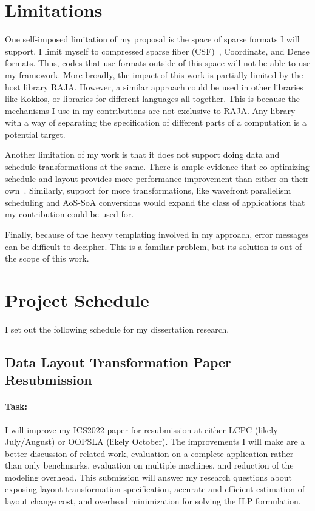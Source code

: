\documentclass{article}
\begin{document}
\section{Limitations}
\label{Sec:Limitations}
One self-imposed limitation of my proposal is the space of sparse formats I will support.
I limit myself to compressed sparse fiber (CSF)~\cite{smith2015tensor}, Coordinate, and Dense formats.
Thus, codes that use formats outside of this space will not be able to use my framework.
More broadly, the impact of this work is partially limited by the host library RAJA. 
However, a similar approach could be used in other libraries like Kokkos, or libraries for different languages all together.
This is because the mechanisms I use in my contributions are not exclusive to RAJA. 
Any library with a way of separating the specification of different parts of a computation is a potential target.

Another limitation of my work is that it does not support doing data and schedule transformations at the same. 
There is ample evidence that co-optimizing schedule and layout provides more performance improvement than either on their own~\cite{shirako2019integrating}.
Similarly, support for more transformations, like wavefront parallelism scheduling and AoS-SoA conversions would expand the class of applications that my contribution could be used for.

Finally, because of the heavy templating involved in my approach, error messages can be difficult to decipher. 
This is a familiar problem, but its solution is out of the scope of this work.


\section{Project Schedule}
\label{Sec:Schedule}
I set out the following schedule for my dissertation research.

\subsection{Data Layout Transformation Paper Resubmission}

\paragraph{Task:} I will improve my ICS2022 paper for resubmission at either LCPC (likely July/August) or OOPSLA (likely October). 
The improvements I will make are a better discussion of related work, evaluation on a complete application rather than only benchmarks, evaluation on multiple machines, and reduction of the modeling overhead.
This submission will answer my research questions about exposing layout transformation specification, accurate and efficient estimation of layout change cost, and overhead minimization for solving the ILP formulation.
\end{document}
